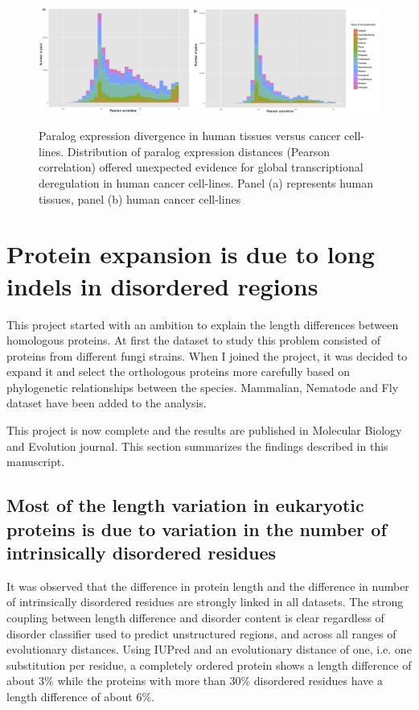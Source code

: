 \documentclass[11pt, a4paper,oneside]{report}
\begin{document}
\begin{figure}[t]
\begin{center}
\label{img:populations}
\includegraphics[width=1\textwidth]{figures/fantom.png}
\end{center}
\caption{Paralog expression divergence in human tissues versus cancer cell-lines.
Distribution of paralog expression distances (Pearson correlation) offered unexpected evidence for global transcriptional deregulation in human cancer cell-lines. Panel (a) represents human tissues, panel (b) human cancer cell-lines} 
\end{figure}

\section{Protein expansion is due to long indels in disordered regions}
This project started with an ambition to explain the length differences between homologous proteins.  At first the dataset to study this problem consisted of proteins from different fungi strains. When I joined the project, it was decided to expand it and select the orthologous proteins more carefully based on phylogenetic relationships between the species. Mammalian, Nematode and Fly dataset have been added to the analysis. 

This project is now complete and the results are published in Molecular Biology and Evolution journal\cite{Light2013}. This section summarizes the findings described in this manuscript. 
\subsection{Most of the length variation in eukaryotic proteins is due to variation in the number of intrinsically disordered residues}
It was observed that the difference in protein length and the difference in number of intrinsically disordered residues are strongly linked in all datasets. The strong coupling between length difference and disorder content is clear regardless of disorder classifier used to predict unstructured regions, and across all ranges of evolutionary distances. Using IUPred and an evolutionary distance of one, i.e. one substitution per residue, a completely ordered protein
shows a length difference of about 3\% while the proteins with more than 30\% disordered residues have a length difference of about 6\%.
\end{document}
